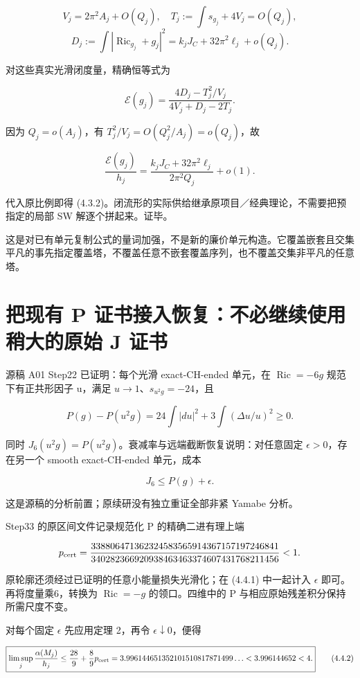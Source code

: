 \documentclass[UTF8,11pt,openany,fontset=none]{ctexbook}
\theoremstyle{definition}
\theoremstyle{remark}
\begin{document}
\[
V_j=2\pi^2A_j+O(Q_j),\quad
T_j:=\int s_{g_j}+4V_j=O(Q_j),
\] \[
D_j:=\int|\operatorname{Ric}_{g_j}+g_j|^2
=k_jJ_C+32\pi^2\ell_j+o(Q_j).
\]

对这些真实光滑闭度量，精确恒等式为

\[
\mathcal E(g_j)=
\frac{4D_j-T_j^2/V_j}{4V_j+D_j-2T_j}.
\tag{4.3.3}
\]

因为 \(Q_j=o(A_j)\)，有 \(T_j^2/V_j=O(Q_j^2/A_j)=o(Q_j)\)，故

\[
\frac{\mathcal E(g_j)}{h_j}
=\frac{k_jJ_C+32\pi^2\ell_j}{2\pi^2Q_j}+o(1).
\]

代入原比例即得 (4.3.2)。闭流形的实际供给继承原项目／经典理论，不需要把预指定的局部 SW 解逐个拼起来。证毕。

这是对已有单元复制公式的量词加强，不是新的廉价单元构造。它覆盖嵌套且交集平凡的事先指定覆盖塔，不覆盖任意不嵌套覆盖序列，也不覆盖交集非平凡的任意塔。

\section{把现有 P 证书接入恢复：不必继续使用稍大的原始 J 证书}\label{v4-ux628aux73b0ux6709-p-ux8bc1ux4e66ux63a5ux5165ux6062ux590dux4e0dux5fc5ux7ee7ux7eedux4f7fux7528ux7a0dux5927ux7684ux539fux59cb-j-ux8bc1ux4e66}

源稿 A01 Step22 已证明：每个光滑 exact-CH-ended 单元，在 \(\operatorname{Ric}=-6g\) 规范下有正共形因子 u，满足 \(u\to1\)、\(s_{u^2g}=-24\)，且

\[
P(g)-P(u^2g)
=24\int|du|^2+3\int(\Delta u/u)^2\ge0.
\]

同时 \(J_6(u^2g)=P(u^2g)\)。衰减率与远端截断恢复说明：对任意固定 \(\epsilon>0\)，存在另一个 smooth exact-CH-ended 单元，成本

\[
J_6\le P(g)+\epsilon.
\tag{4.4.1}
\]

这是源稿的分析前置；原续研没有独立重证全部非紧 Yamabe 分析。

Step33 的原区间文件记录规范化 P 的精确二进有理上端

\[
p_{\rm cert}=
\frac{338806471362324583565914367157197246841}
{340282366920938463463374607431768211456}
<1.
\]

原轮廓还须经过已证明的任意小能量损失光滑化；在 (4.4.1) 中一起计入 \(\epsilon\) 即可。再将度量乘6，转换为 \(\operatorname{Ric}=-g\) 的领口。四维中的 P 与相应原始残差积分保持所需尺度不变。

对每个固定 \(\epsilon\) 先应用定理 2，再令 \(\epsilon\downarrow0\)，便得

\[
\boxed{
\limsup_j\frac{\alpha(M_j)}{h_j}
\le\frac{28}{9}+\frac89p_{\rm cert}
=3.996144651352101510817871499\ldots
<3.996144652<4.
}
\tag{4.4.2}
\]
\end{document}
